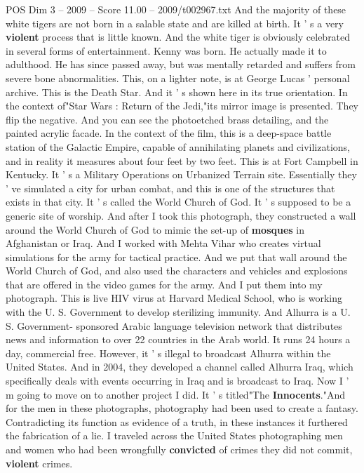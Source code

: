 \begin{textsample}{POS Dim 3 – 2009 – Score 11.00 – 2009/t002967.txt}
And the majority of these white tigers are not born in a salable state and are killed at birth.
It ' s a very \textbf{violent} process that is little known.
And the white tiger is obviously celebrated in several forms of entertainment.
Kenny was born.
He actually made it to adulthood.
He has since passed away, but was mentally retarded and suffers from severe bone abnormalities.
This, on a lighter note, is at George Lucas ' personal archive.
This is the Death Star.
And it ' s shown here in its true orientation.
In the context of"Star Wars : Return of the Jedi,"its mirror image is presented.
They flip the negative.
And you can see the photoetched brass detailing, and the painted acrylic facade.
In the context of the film, this is a deep-space battle station of the Galactic Empire, capable of annihilating planets and civilizations, and in reality it measures about four feet by two feet.
This is at Fort Campbell in Kentucky.
It ' s a Military Operations on Urbanized Terrain site.
Essentially they ' ve simulated a city for urban combat, and this is one of the structures that exists in that city.
It ' s called the World Church of God.
It ' s supposed to be a generic site of worship.
And after I took this photograph, they constructed a wall around the World Church of God to mimic the set-up of \textbf{mosques} in Afghanistan or Iraq.
And I worked with Mehta Vihar who creates virtual simulations for the army for tactical practice.
And we put that wall around the World Church of God, and also used the characters and vehicles and explosions that are offered in the video games for the army.
And I put them into my photograph.
This is live HIV virus at Harvard Medical School, who is working with the U.
S.
Government to develop sterilizing immunity.
And Alhurra is a U.
S.
Government- sponsored Arabic language television network that distributes news and information to over 22 countries in the Arab world.
It runs 24 hours a day, commercial free.
However, it ' s illegal to broadcast Alhurra within the United States.
And in 2004, they developed a channel called Alhurra Iraq, which specifically deals with events occurring in Iraq and is broadcast to Iraq.
Now I ' m going to move on to another project I did.
It ' s titled"The \textbf{Innocents}."And for the men in these photographs, photography had been used to create a fantasy.
Contradicting its function as evidence of a truth, in these instances it furthered the fabrication of a lie.
I traveled across the United States photographing men and women who had been wrongfully \textbf{convicted} of crimes they did not commit, \textbf{violent} crimes.

\end{textsample}
